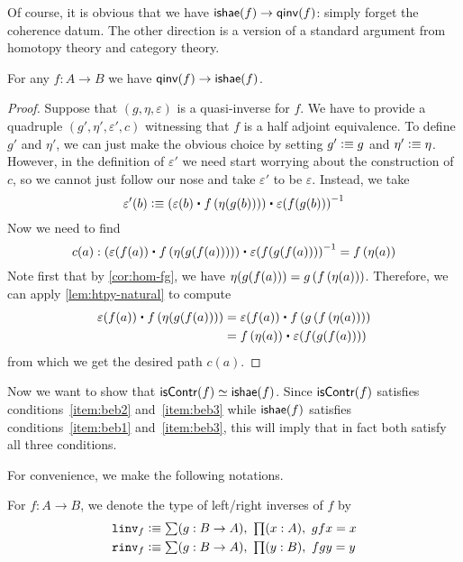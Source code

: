 Of course, it is obvious that we have $\mathsf{ishae}(f) \to\mathsf{qinv}(f)$: simply forget the coherence datum.
The other direction is a version of a standard argument from homotopy theory and category theory.

\begin{thm}\label{thm:equiv-iso-adj}
  For any $f:A\to B$ we have $\mathsf{qinv}(f)\to\mathsf{ishae}(f)$.
\end{thm}
\begin{proof}
Suppose that $(g,\eta,\varepsilon)$ is a quasi-inverse for $f$. We have to provide
a quadruple $(g',\eta',\varepsilon',c)$ witnessing that $f$ is a half adjoint equivalence. To
define $g'$ and $\eta'$, we can just make the obvious choice by setting $g'
\vcentcolon\equiv g$ and $\eta'\vcentcolon\equiv \eta$. However, in the definition of $\varepsilon'$ we
need start worrying about the construction of $c$, so we cannot just follow our nose
and take $\varepsilon'$ to be $\varepsilon$. Instead, we take
\begin{equation*}
\varepsilon'(b) \defeq (\varepsilon(b)\ct \ap{f}{\eta(g(b))})\ct \opp{\varepsilon(f(g(b)))}
\end{equation*}
Now we need to find
\begin{equation*}
c(a):(\varepsilon(f(a))\ct \ap{f}{\eta(g(f(a)))})\ct \opp{\varepsilon(f(g(f(a))))}=\ap{f}{\eta(a)}
\end{equation*}
Note first that by \autoref{cor:hom-fg}, we have 
$\eta(g(f(a)))={g}\left({{f}\left({\eta(a)}\right)}\right)$. Therefore, we can apply
\autoref{lem:htpy-natural} to compute
\begin{align*}
\varepsilon(f(a))\ct \ap{f}{\eta(g(f(a)))}
& = \varepsilon(f(a))\ct \ap{f}{\ap{g}{\ap{f}{\eta(a)}}}\\
& = \ap{f}{\eta(a)}\ct\varepsilon(f(g(f(a))))
\end{align*}
from which we get the desired path $c(a)$.
\end{proof}

Now we want to show that $\mathsf{isContr}(f) \simeq \mathsf{ishae}(f)$.
Since $\mathsf{isContr}(f)$ satisfies conditions~\ref{item:beb2} and~\ref{item:beb3} while $\mathsf{ishae}(f)$ satisfies conditions~\ref{item:beb1} and~\ref{item:beb3}, this will imply that in fact both satisfy all three conditions.

For convenience, we make the following notations.
\begin{defn}
For $f : A \to B$, we denote the type of left/right inverses of $f$ by 
\begin{align*}
\lin{f} & \defeq \sm{g : B \to A} \prd{x: A} gfx = x\\
\rin{f} & \defeq \sm{g : B \to A} \prd{y: B} fgy = y
\end{align*}
\end{defn}

